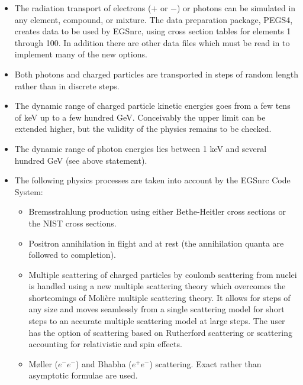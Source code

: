 \begin{itemize} 
\item The radiation transport of electrons ($+$ or $-$) or photons
can be simulated in any element, compound, or mixture.  
The data preparation package, PEGS4, creates data to be used by
EGSnrc, using cross section tables for elements 1 through 100. In addition
there are other data files which must be read in to implement many of the
new options.

\item Both photons and charged particles are transported in
steps of random length rather than in discrete steps.

\item The dynamic range of charged particle kinetic energies
goes from a few tens of keV up to a few hundred GeV.  Conceivably
the upper limit can be extended higher, but the validity of the
physics remains to be checked.

\item The dynamic range of photon energies lies between 1 keV and
several hundred GeV (see above statement).

\item The following physics processes are taken into account
by the EGSnrc Code System:

\begin{itemize} 
  \item Bremsstrahlung production using either Bethe-Heitler cross sections
or the NIST cross sections.

  \item Positron annihilation in flight and at rest
  (the annihilation quanta are followed to completion).

  \item Multiple scattering of charged particles by coulomb scattering from
nuclei is handled using a new
multiple scattering theory which overcomes the shortcomings of Moli\`ere 
multiple scattering theory. It allows for steps of any size and
moves seamlessly from a single scattering
model for short steps to an  accurate multiple scattering model
at large steps.  The user has the option of scattering based on
Rutherford scattering or scattering accounting for relativistic and spin
effects.

  \item M\o ller ($e^-e^-$) and Bhabha ($e^+e^-$) scattering.
  Exact rather than asymptotic formulae are used.


\end{itemize}
\end{itemize}
